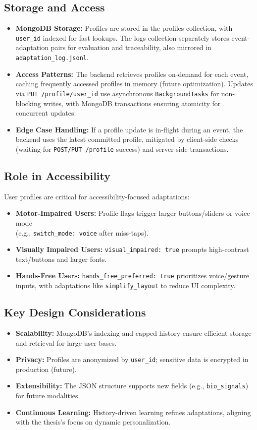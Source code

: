 \documentclass[openany]{book}
\begin{document}
\subsection{Storage and Access}
\begin{itemize}
    \item \textbf{MongoDB Storage:} Profiles are stored in the profiles collection, with \texttt{user\_id} indexed for fast lookups. The logs collection separately stores event-adaptation pairs for evaluation and traceability, also mirrored in \texttt{adaptation\_log.jsonl}.
    \item \textbf{Access Patterns:} The backend retrieves profiles on-demand for each event, caching frequently accessed profiles in memory (future optimization). Updates via \texttt{PUT /profile/{user\_id}} use asynchronous \texttt{BackgroundTasks} for non-blocking writes, with MongoDB transactions ensuring atomicity for concurrent updates.
    \item \textbf{Edge Case Handling:} If a profile update is in-flight during an event, the backend uses the latest committed profile, mitigated by client-side checks (waiting for \texttt{POST/PUT /profile} success) and server-side transactions.
\end{itemize}

\subsection{Role in Accessibility}
User profiles are critical for accessibility-focused adaptations:
\begin{itemize}
    \item \textbf{Motor-Impaired Users:} Profile flags trigger larger buttons/sliders or voice mode \\ (e.g., \texttt{switch\_mode: voice} after miss-taps).
    \item \textbf{Visually Impaired Users:} \texttt{visual\_impaired: true} prompts high-contrast text/buttons and larger fonts.
    \item \textbf{Hands-Free Users:} \texttt{hands\_free\_preferred: true} prioritizes voice/gesture inputs, with adaptations like \texttt{simplify\_layout} to reduce UI complexity.
\end{itemize}
\subsection{Key Design Considerations}
\begin{itemize}
    \item \textbf{Scalability:} MongoDB’s indexing and capped history ensure efficient storage and retrieval for large user bases.
    \item \textbf{Privacy:} Profiles are anonymized by \texttt{user\_id}; sensitive data is encrypted in production (future).
    \item \textbf{Extensibility:} The JSON structure supports new fields (e.g., \texttt{bio\_signals}) for future modalities.
    \item \textbf{Continuous Learning:} History-driven learning refines adaptations, aligning with the thesis’s focus on dynamic personalization.
\end{itemize}
\end{document}
